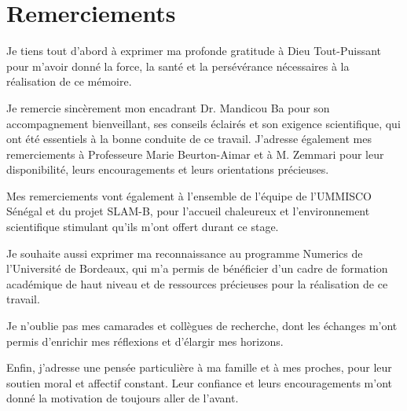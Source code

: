 \documentclass[12pt,a4paper,oneside]{report}
\begin{document}
\chapter*{Remerciements}
\begin{flushleft}
Je tiens tout d’abord à exprimer ma profonde gratitude à Dieu Tout-Puissant pour m’avoir donné la force, la santé et la persévérance nécessaires à la réalisation de ce mémoire.

Je remercie sincèrement mon encadrant Dr. Mandicou Ba pour son accompagnement bienveillant, ses conseils éclairés et son exigence scientifique, qui ont été essentiels à la bonne conduite de ce travail. J’adresse également mes remerciements à Professeure Marie Beurton-Aimar et à M. Zemmari pour leur disponibilité, leurs encouragements et leurs orientations précieuses.

Mes remerciements vont également à l’ensemble de l’équipe de l’UMMISCO Sénégal et du projet SLAM-B, pour l’accueil chaleureux et l’environnement scientifique stimulant qu’ils m’ont offert durant ce stage.

Je souhaite aussi exprimer ma reconnaissance au programme Numerics de l’Université de Bordeaux, qui m’a permis de bénéficier d’un cadre de formation académique de haut niveau et de ressources précieuses pour la réalisation de ce travail.

Je n’oublie pas mes camarades et collègues de recherche, dont les échanges m’ont permis d’enrichir mes réflexions et d’élargir mes horizons.

Enfin, j’adresse une pensée particulière à ma famille et à mes proches, pour leur soutien moral et affectif constant. Leur confiance et leurs encouragements m’ont donné la motivation de toujours aller de l’avant.
\end{flushleft}
\vspace{2cm}
\end{document}
